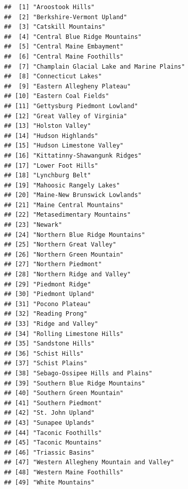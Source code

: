 \documentclass[
]{book}
\begin{document}
\begin{verbatim}
##  [1] "Aroostook Hills"                         
##  [2] "Berkshire-Vermont Upland"                
##  [3] "Catskill Mountains"                      
##  [4] "Central Blue Ridge Mountains"            
##  [5] "Central Maine Embayment"                 
##  [6] "Central Maine Foothills"                 
##  [7] "Champlain Glacial Lake and Marine Plains"
##  [8] "Connecticut Lakes"                       
##  [9] "Eastern Allegheny Plateau"               
## [10] "Eastern Coal Fields"                     
## [11] "Gettysburg Piedmont Lowland"             
## [12] "Great Valley of Virginia"                
## [13] "Holston Valley"                          
## [14] "Hudson Highlands"                        
## [15] "Hudson Limestone Valley"                 
## [16] "Kittatinny-Shawangunk Ridges"            
## [17] "Lower Foot Hills"                        
## [18] "Lynchburg Belt"                          
## [19] "Mahoosic Rangely Lakes"                  
## [20] "Maine-New Brunswick Lowlands"            
## [21] "Maine Central Mountains"                 
## [22] "Metasedimentary Mountains"               
## [23] "Newark"                                  
## [24] "Northern Blue Ridge Mountains"           
## [25] "Northern Great Valley"                   
## [26] "Northern Green Mountain"                 
## [27] "Northern Piedmont"                       
## [28] "Northern Ridge and Valley"               
## [29] "Piedmont Ridge"                          
## [30] "Piedmont Upland"                         
## [31] "Pocono Plateau"                          
## [32] "Reading Prong"                           
## [33] "Ridge and Valley"                        
## [34] "Rolling Limestone Hills"                 
## [35] "Sandstone Hills"                         
## [36] "Schist Hills"                            
## [37] "Schist Plains"                           
## [38] "Sebago-Ossipee Hills and Plains"         
## [39] "Southern Blue Ridge Mountains"           
## [40] "Southern Green Mountain"                 
## [41] "Southern Piedmont"                       
## [42] "St. John Upland"                         
## [43] "Sunapee Uplands"                         
## [44] "Taconic Foothills"                       
## [45] "Taconic Mountains"                       
## [46] "Triassic Basins"                         
## [47] "Western Allegheny Mountain and Valley"   
## [48] "Western Maine Foothills"                 
## [49] "White Mountains"
\end{verbatim}
\end{document}
